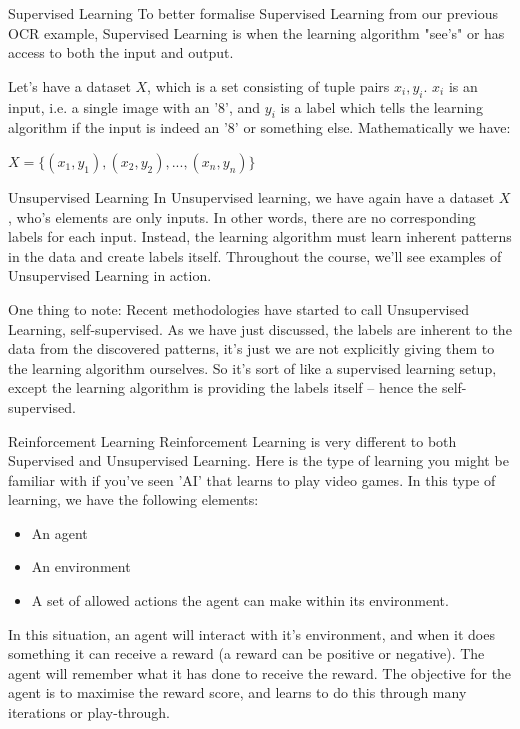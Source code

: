 \documentclass[10pt]{beamer}
\begin{document}
\begin{frame}[label={sec:org2f2adc2}]{Supervised Learning}
To better formalise Supervised Learning from our previous OCR example, Supervised
Learning is when the learning algorithm "see's" or has access to both the input and
output.

Let's have a dataset \(X\), which is a set consisting of tuple pairs \(x_i, y_i\). \(x_i\)
is an input, i.e. a single image with an '8', and \(y_i\) is a label which tells the
learning algorithm if the input is indeed an '8' or something else. Mathematically we have:

\(X = \{(x_1, y_1), (x_2, y_2), ..., (x_n, y_n)\}\)
\end{frame}

\begin{frame}[label={sec:orgfa5a45f}]{Unsupervised Learning}
In Unsupervised learning, we have again have a dataset \(X\), who's elements are only
inputs. In other words, there are no corresponding labels for each input. Instead,
the learning algorithm must learn inherent patterns in the data and create labels
itself. Throughout the course, we'll see examples of Unsupervised Learning in action.

One thing to note: Recent methodologies have started to call Unsupervised Learning,
self-supervised. As we have just discussed, the labels are inherent to the data from
the discovered patterns, it's just we are not explicitly giving them to the learning
algorithm ourselves. So it's sort of like a supervised learning setup, except the
learning algorithm is providing the labels itself -- hence the self-supervised.
\end{frame}

\begin{frame}[label={sec:org9dab41e}]{Reinforcement Learning}
Reinforcement Learning is very different to both Supervised and Unsupervised
Learning. Here is the type of learning you might be familiar with if you've seen 'AI'
that learns to play video games. In this type of learning, we have the following
elements:

\begin{itemize}
\item An agent
\item An environment
\item A set of allowed actions the agent can make within its environment.
\end{itemize}

In this situation, an agent will interact with it's environment, and when it does
something it can receive a reward (a reward can be positive or negative). The agent
will remember what it has done to receive the reward. The objective for the agent is
to maximise the reward score, and learns to do this through many iterations or
play-through.
\end{frame}
\end{document}
